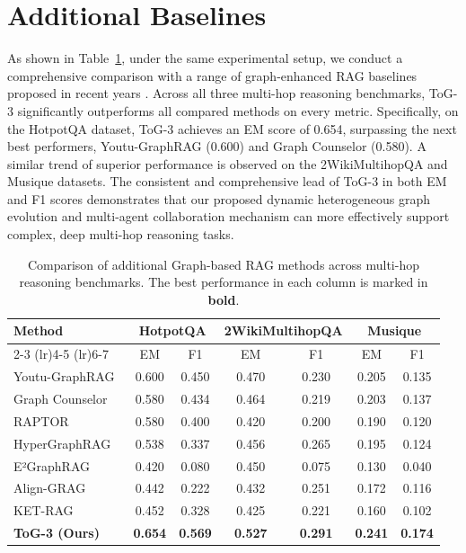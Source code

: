 \section{Additional Baselines}
\label{appendix:add_baselines}

As shown in Table~\ref{tab:additional_baselines}, under the same experimental setup, we conduct a comprehensive comparison with a range of graph-enhanced RAG baselines proposed in recent years . Across all three multi-hop reasoning benchmarks, ToG-3 significantly outperforms all compared methods on every metric. Specifically, on the HotpotQA dataset, ToG-3 achieves an EM score of 0.654, surpassing the next best performers, Youtu-GraphRAG (0.600) and Graph Counselor (0.580). A similar trend of superior performance is observed on the 2WikiMultihopQA and Musique datasets. The consistent and comprehensive lead of ToG-3 in both EM and F1 scores demonstrates that our proposed dynamic heterogeneous graph evolution and multi-agent collaboration mechanism can more effectively support complex, deep multi-hop reasoning tasks.

\begin{table}[t]
\centering
\caption{Comparison of additional Graph-based RAG methods across multi-hop reasoning benchmarks. The best performance in each column is marked in \textbf{bold}.}
\label{tab:additional_baselines}
\small
\begin{tabular}{lcccccc}
\toprule
\multirow{2}{*}{Method} & \multicolumn{2}{c}{HotpotQA} & \multicolumn{2}{c}{2WikiMultihopQA} & \multicolumn{2}{c}{Musique} \\
\cmidrule(lr){2-3} \cmidrule(lr){4-5} \cmidrule(lr){6-7}
 & EM & F1 & EM & F1 & EM & F1 \\
\midrule
Youtu-GraphRAG~\citep{dong2025youtu} & 0.600 & 0.450 & 0.470 & 0.230 & 0.205 & 0.135 \\
Graph Counselor~\citep{gao2025graph-counselor} & 0.580 & 0.434 & 0.464 & 0.219 & 0.203 & 0.137 \\
RAPTOR~\citep{raptor} & 0.580 & 0.400 & 0.420 & 0.200 & 0.190 & 0.120 \\
HyperGraphRAG~\citep{luo2025hypergraphrag} & 0.538 & 0.337 & 0.456 & 0.265 & 0.195 & 0.124 \\
E²GraphRAG~\citep{zhao2025e2graphrag} & 0.420 & 0.080 & 0.450 & 0.075 & 0.130 & 0.040 \\
Align-GRAG~\citep{xu2025align-grag} & 0.442 & 0.222 & 0.432 & 0.251 & 0.172 & 0.116 \\
KET-RAG~\citep{huang2025ket} & 0.452 & 0.328 & 0.425 & 0.221 & 0.160 & 0.102 \\
\midrule
\textbf{ToG-3 (Ours)} & \textbf{0.654} & \textbf{0.569} & \textbf{0.527} & \textbf{0.291} & \textbf{0.241} & \textbf{0.174} \\
\bottomrule
\end{tabular}
\end{table}